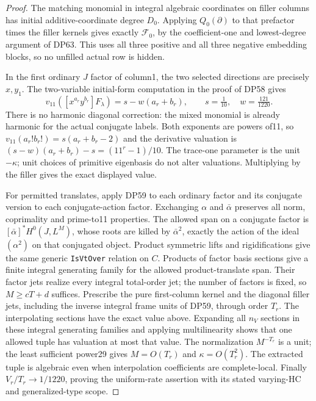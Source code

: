 \begin{proof}
The matching monomial in integral algebraic coordinates on filler
columns has initial additive-coordinate degree $D_0$. Applying
$Q_0(\partial)$ to that prefactor times the filler kernels gives exactly
$\mathcal F_0$, by the coefficient-one and lowest-degree argument of
DP63. This uses all three positive and all three negative embedding
blocks, so no unfilled actual row is hidden.

In the first ordinary $J$ factor of column1, the two selected directions
are precisely $x,y_1$. The two-variable initial-form computation in the proof of DP58 gives
\[
 v_{11}([x^{a_r}y^{b_r}]F_\lambda)=s-w(a_r+b_r),
 \qquad s=\tfrac1{10},\quad w=\tfrac{121}{1220}.
\]
There is no harmonic diagonal correction: the mixed monomial is already
harmonic for the actual conjugate labels. Both exponents are powers of11,
so $v_{11}(a_r!b_r!)=s(a_r+b_r-2)$ and the derivative valuation is
$(s-w)(a_r+b_r)-s=(11^r-1)/10$. The trace-one parameter is the unit
$-\kappa$; unit choices of primitive eigenbasis do not alter valuations.
Multiplying by the filler gives the exact displayed value.

For permitted translates, apply DP59 to each ordinary factor and its
conjugate version to each conjugate-action factor. Exchanging
$\alpha$ and $\bar\alpha$ preserves all norm, coprimality and prime-to11
properties. The allowed span on a conjugate factor is
$[\bar\alpha]^*H^0(J,L^M)$, whose roots are killed by
$\bar\alpha^2$, exactly the action of the ideal $(\alpha^2)$ on that
conjugated object. Product symmetric lifts and rigidifications give the
same generic \texttt{IsVtOver} relation on $C$.
Products of factor basis sections give a finite integral generating family
for the allowed product-translate span. Their factor jets realize every
integral total-order jet; the number of factors is fixed, so $M\ge cT+d$ suffices.
Prescribe the pure first-column kernel and the diagonal filler jets,
including the inverse integral frame units of DP59, through order $T_r$.
The interpolating sections have the exact value above. Expanding all
$n_V$ sections in these integral generating families and applying multilinearity
shows that one allowed tuple has valuation at most that value.
The normalization $M^{-T_r}$ is a unit; the least sufficient power29
gives $M=O(T_r)$ and $\kappa=O(T_r^2)$. The extracted tuple is algebraic
even when interpolation coefficients are complete-local.
Finally $V_r/T_r\to1/1220$, proving the uniform-rate assertion with
its stated varying-HC and generalized-type scope.
\end{proof}
